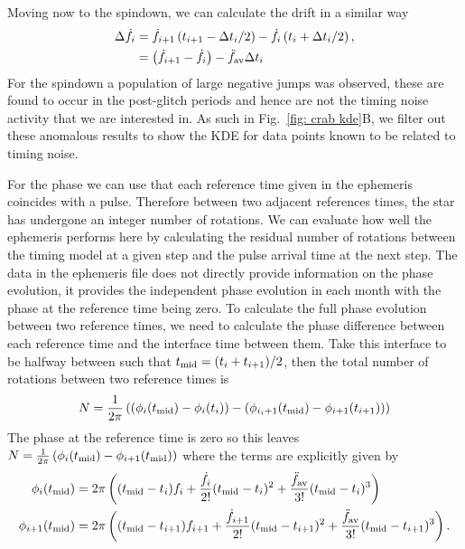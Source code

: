 \documentclass[../full_thesis/full_thesis.tex]{subfiles}
\begin{document}
Moving now to the spindown, we can calculate the drift in a similar way
\begin{align}
\Delta\dot{f}_{i} & = \dot{f}_{i+1}\left(t_{i+1}-\Delta t_{i}/2\right) -  \dot{f}_{i}\left(t_{i}+\Delta t_{i}/2\right), \\
& = \left(\dot{f}_{i+1}-\dot{f}_{i}\right) -  \ddot{f}_{\textrm{av}} \Delta t_{i}
\label{eqn: crab spindown residuals}
\end{align}
For the spindown a population of large negative jumps was observed, these are
found to occur in the post-glitch periods and hence are not the timing noise
activity that we are interested in. As such in Fig.~\ref{fig: crab kde}B, we
filter out these anomalous results to show the KDE for data points known to be
related to timing noise.

For the phase we can use that each reference time given in the ephemeris
coincides with a pulse. Therefore between two adjacent references times, the
star has undergone an integer number of rotations. We can evaluate how well the
ephemeris performs here by calculating the residual number of rotations between
the timing model at a given step and the pulse arrival time at the next step.
The data in the ephemeris file does not directly provide information on the
phase evolution, it provides the independent phase evolution in each month with
the phase at the reference time being zero. To calculate the full phase
evolution between two reference times, we need to calculate the phase
difference between each reference time and the interface time between them.
Take this interface to be halfway between such that $t_{\textrm{mid}}=(t_{i} +
t_{i+1})/2$, then the total number of rotations between two reference times is
\begin{equation}
    N = \frac{1}{2\pi}\left(\left(\phi_{i}(t_{\textrm{mid}}) - \phi_{i}(t_{i})\right) -
    \left(\phi_{i_i+1}(t_{\textrm{mid}}) - \phi_{i+1}(t_{i+1})\right)\right)
\end{equation}
The phase at the reference time is zero so this leaves $N =
\frac{1}{2\pi}\left(\phi_{i}(t_{\textrm{mid}}) - \phi_{i+1}(t_{\textrm{mid}})\right)$ where the terms
are explicitly given by
\begin{align}
\phi_{i}(t_{\textrm{mid}}) & = 2\pi\left((t_{\textrm{mid}} - t_{i})f_{i} +  \frac{\dot{f}_{i}}{2!}(t_{\textrm{mid}} - t_{i})^{2}+\frac{\ddot{f}_{\textrm{av}}}{3!}(t_{\textrm{mid}} - t_{i})^{3}\right) \\
\phi_{i+1}(t_{\textrm{mid}}) & = 2\pi\left((t_{\textrm{mid}} - t_{i+1})f_{i+1} +  \frac{\dot{f}_{i+1}}{2!}(t_{\textrm{mid}} - t_{i+1})^{2}+\frac{\ddot{f}_{\textrm{av}}}{3!}(t_{\textrm{mid}} - t_{i+1})^{3}\right) .
\end{align}
\end{document}
